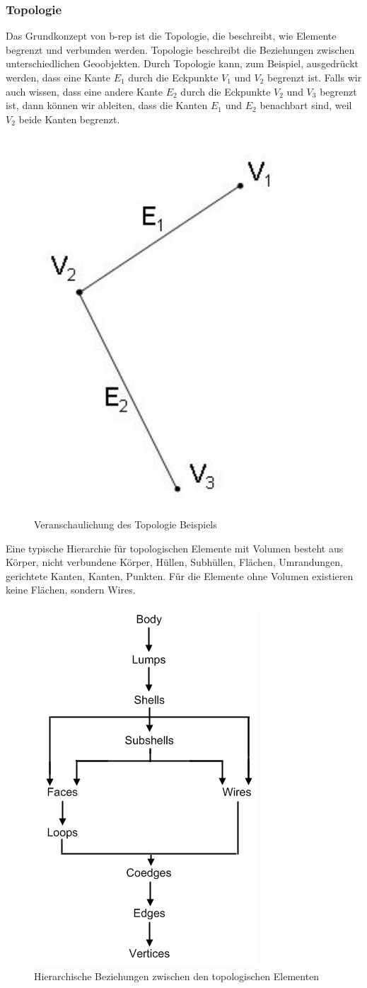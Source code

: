 \documentclass[14pt,a4paper,titlepage]{article}
\begin{document}
	\subsubsection{Topologie}
		Das Grundkonzept von \acf{b-rep} ist die Topologie, die beschreibt, wie Elemente begrenzt und verbunden werden. Topologie beschreibt die Beziehungen zwischen unterschiedlichen Geoobjekten.
		\bigbreak
		Durch Topologie kann, zum Beispiel, ausgedrückt werden, dass eine Kante \( E_1 \) durch die Eckpunkte  \( V_1 \) und \( V_2 \) begrenzt ist. Falls wir auch wissen, dass eine andere Kante \( E_2 \) durch die Eckpunkte \( V_2 \) und \( V_3 \) begrenzt ist, dann können wir ableiten, dass die Kanten \( E_1 \) und \( E_2 \) benachbart sind, weil \( V_2 \) beide Kanten begrenzt. 
				\begin{figure}[h!]
				\centering
				\includegraphics[width=0.25\linewidth]{beispieltopologie.png}
				\caption{Veranschaulichung des Topologie Beispiels}
				\label{fig9}
			\end{figure}
		\pagebreak
		\bigbreak
		Eine typische Hierarchie für topologischen Elemente mit Volumen besteht aus Körper, nicht verbundene Körper, Hüllen, Subhüllen, Flächen, Umrandungen, gerichtete Kanten, Kanten, Punkten. Für die Elemente ohne Volumen existieren keine Flächen, sondern Wires.  
			\begin{figure}[h!]
			\centering
			\includegraphics[width=0.5\linewidth]{topology.png}
			\caption{Hierarchische Beziehungen zwischen den topologischen Elementen}
			\label{fig8}
			\end{figure}
	\pagebreak
\end{document}
